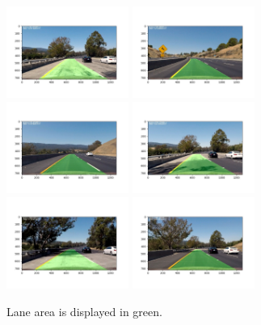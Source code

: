 \documentclass[a4paper,10pt]{article}
\begin{document}
\begin{figure}[h]
  \begin{center}
    \includegraphics[width=40mm]{../output_images/test1_processed.jpg}
    \quad
    \includegraphics[width=40mm]{../output_images/test2_processed.jpg}
    \quad
   \includegraphics[width=40mm]{../output_images/test3_processed.jpg}
   \quad
   \includegraphics[width=40mm]{../output_images/test4_processed.jpg}
   \quad
   \includegraphics[width=40mm]{../output_images/test5_processed.jpg}
   \quad
   \includegraphics[width=40mm]{../output_images/test6_processed.jpg}
  \caption{Lane area is displayed in green.}
\end{center}
\end{figure}
\end{document}
